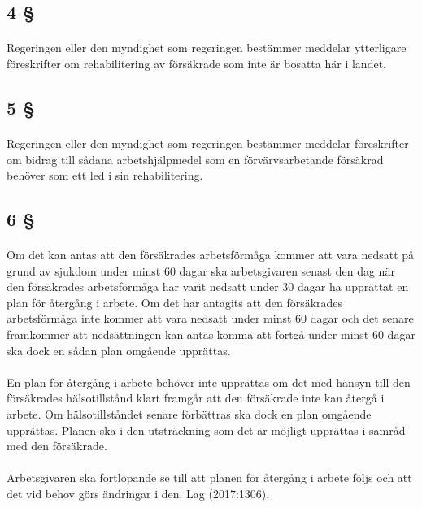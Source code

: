 \documentclass[a4paper,notitlepage,openany,10pt]{book}
\begin{document}
\subsection*{4 §}
\paragraph*{}
Regeringen eller den myndighet som regeringen bestämmer meddelar ytterligare föreskrifter om rehabilitering av försäkrade som inte är bosatta här i landet.
\subsection*{5 §}
\paragraph*{}
Regeringen eller den myndighet som regeringen bestämmer meddelar föreskrifter om bidrag till sådana arbetshjälpmedel som en förvärvsarbetande försäkrad behöver som ett led i sin rehabilitering.
\subsection*{6 §}
\paragraph*{}
Om det kan antas att den försäkrades arbetsförmåga kommer att vara nedsatt på grund av sjukdom under minst 60 dagar ska arbetsgivaren senast den dag när den försäkrades arbetsförmåga har varit nedsatt under 30 dagar ha upprättat en plan för återgång i arbete. Om det har antagits att den försäkrades arbetsförmåga inte kommer att vara nedsatt under minst 60 dagar och det senare framkommer att nedsättningen kan antas komma att fortgå under minst 60 dagar ska dock en sådan plan omgående upprättas.
\paragraph*{}
En plan för återgång i arbete behöver inte upprättas om det med hänsyn till den försäkrades hälsotillstånd klart framgår att den försäkrade inte kan återgå i arbete. Om hälsotillståndet senare förbättras ska dock en plan omgående upprättas. Planen ska i den utsträckning som det är möjligt upprättas i samråd med den försäkrade.
\paragraph*{}
Arbetsgivaren ska fortlöpande se till att planen för återgång i arbete följs och att det vid behov görs ändringar i den.
Lag (2017:1306).
\end{document}
